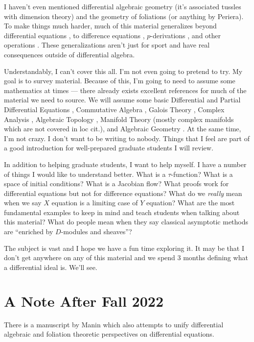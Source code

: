 \documentclass[12pt]{book}
\numberwithin{equation}{section}
\theoremstyle{definition}
\theoremstyle{remark}
\begin{document}
I haven't even mentioned differential algebraic geometry (it's associated tussles with dimension theory) and the geometry of foliations \cite{Bryant1991} (or anything by Periera). To make things much harder, much of this material generalizes beyond differential equations , to difference equations \cite{Hrushovski2004}, $p$-derivations \cite{Buium2005}, and other operations \cite{Borger2005}.
These generalizations aren't just for sport and have real consequences outside of differential algebra.

Understandably, I can't cover this all. 
I'm not even going to pretend to try. 
My goal is to survey material.
Because of this, I'm going to need to assume some mathematics at times --- there already exists excellent references for much of the material we need to source.  
We will assume some basic Differential \cite{Ince1944} and Partial Differential Equations \cite{Evans2010}, Commutative Algebra \cite{Atiyah2016}, Galois Theory \cite{Cox2012}, Complex Analysis \cite{Ullrich2008}, Algebraic Topology \cite{Hatcher2002}, Manifold Theory \cite{Lee2013} (mostly complex manifolds which are not covered in loc cit.), and Algebraic Geometry \cite{Vakil2017}. 
At the same time, I'm not crazy. 
I don't want to be writing to nobody. 
Things that I feel are part of a good introduction for well-prepared graduate students I will review. 

In addition to helping graduate students, I want to help  myself.
I have a number of things I would like to understand better. What is a $\tau$-function? What is a space of initial conditions? 
What is a Jacobian flow? What proofs work for differential equations but not for difference equations? 
What do we \emph{really} mean when we say $X$ equation is a limiting case of $Y$ equation?
What are the most fundamental examples to keep in mind and teach students when talking about this material?
What do people mean when they say classical asymptotic methods are ``enriched by $D$-modules and sheaves''?

The subject is vast and I hope we have a fun time exploring it. 
It may be that I don't get anywhere on any of this material and we spend 3 months defining what a differential ideal is. 
We'll see. 

\iffalse
\section{A Note After Fall 2022} 
There is a manuscript by Manin \cite{Manin1978} which also attempts to unify differential algebraic and foliation theoretic perspectives on differential equations.
\end{document}
